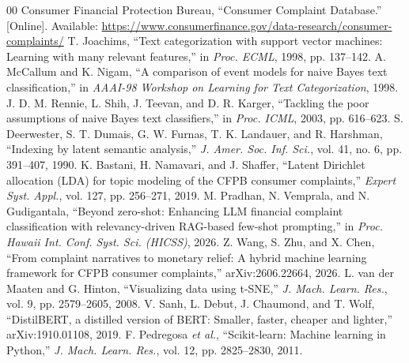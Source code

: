 \documentclass[conference]{IEEEtran}
\begin{document}
\begin{thebibliography}{00}
 Consumer Financial Protection Bureau, ``Consumer Complaint Database.'' [Online]. Available: \url{https://www.consumerfinance.gov/data-research/consumer-complaints/}
 T. Joachims, ``Text categorization with support vector machines: Learning with many relevant features,'' in \textit{Proc. ECML}, 1998, pp. 137--142.
 A. McCallum and K. Nigam, ``A comparison of event models for naive Bayes text classification,'' in \textit{AAAI-98 Workshop on Learning for Text Categorization}, 1998.
 J. D. M. Rennie, L. Shih, J. Teevan, and D. R. Karger, ``Tackling the poor assumptions of naive Bayes text classifiers,'' in \textit{Proc. ICML}, 2003, pp. 616--623.
 S. Deerwester, S. T. Dumais, G. W. Furnas, T. K. Landauer, and R. Harshman, ``Indexing by latent semantic analysis,'' \textit{J. Amer. Soc. Inf. Sci.}, vol. 41, no. 6, pp. 391--407, 1990.
 K. Bastani, H. Namavari, and J. Shaffer, ``Latent Dirichlet allocation (LDA) for topic modeling of the CFPB consumer complaints,'' \textit{Expert Syst. Appl.}, vol. 127, pp. 256--271, 2019.
 M. Pradhan, N. Vemprala, and N. Gudigantala, ``Beyond zero-shot: Enhancing LLM financial complaint classification with relevancy-driven RAG-based few-shot prompting,'' in \textit{Proc. Hawaii Int. Conf. Syst. Sci. (HICSS)}, 2026.
 Z. Wang, S. Zhu, and X. Chen, ``From complaint narratives to monetary relief: A hybrid machine learning framework for CFPB consumer complaints,'' arXiv:2606.22664, 2026.
 L. van der Maaten and G. Hinton, ``Visualizing data using t-SNE,'' \textit{J. Mach. Learn. Res.}, vol. 9, pp. 2579--2605, 2008.
 V. Sanh, L. Debut, J. Chaumond, and T. Wolf, ``DistilBERT, a distilled version of BERT: Smaller, faster, cheaper and lighter,'' arXiv:1910.01108, 2019.
 F. Pedregosa \textit{et al.}, ``Scikit-learn: Machine learning in Python,'' \textit{J. Mach. Learn. Res.}, vol. 12, pp. 2825--2830, 2011.
\end{thebibliography}
\end{document}
